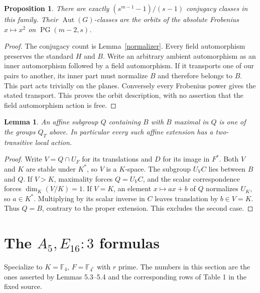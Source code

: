 \documentclass[11pt]{article}
\newtheorem{lemma}[theorem]{Lemma}
\newtheorem{proposition}[theorem]{Proposition}
\newcommand{\F}{\mathbb F}
\newcommand{\PG}{\operatorname{PG}}
\newcommand{\Aut}{\operatorname{Aut}}
\begin{document}
\begin{proposition}\label{general}
There are exactly $(s^{m-1}-1)/(s-1)$ conjugacy classes in this family.
Their $\Aut(G)$-classes are the orbits of the absolute Frobenius
$x\mapsto x^2$ on $\PG(m-2,s)$.
\end{proposition}
\begin{proof}
The conjugacy count is Lemma~\ref{normalizer}. Every field automorphism
preserves the standard $H$ and $B$. Write an arbitrary ambient
automorphism as an inner automorphism followed by a field automorphism.
If it transports one of our pairs to another, its inner part must
normalize $B$ and therefore belongs to $B$. This part acts trivially
on the planes. Conversely every Frobenius power gives the stated
transport. This proves the orbit description, with no assertion that
the field automorphism action is free.
\end{proof}

\begin{lemma}\label{affine}
An affine subgroup $Q$ containing $B$ with $B$ maximal in $Q$ is one of
the groups $Q_T$ above. In particular every such affine extension has
a two-transitive local action.
\end{lemma}
\begin{proof}
Write $V=Q\cap U_F$ for its translations and $D$ for its image in
$F^*$. Both $V$ and $K$ are stable under $K^*$, so $V$ is a
$K$-space. The subgroup $U_VC$ lies between $B$ and $Q$. If $V>K$,
maximality forces $Q=U_VC$, and the scalar correspondence forces
$\dim_K(V/K)=1$. If $V=K$, an element $x\mapsto ax+b$ of $Q$
normalizes $U_K$, so $a\in K^*$. Multiplying by its scalar inverse
in $C$ leaves translation by $b\in V=K$. Thus $Q=B$, contrary to
the proper extension. This excludes the second case.
\end{proof}

\section{The $A_5,E_{16}:3$ formulas}
Specialize to $K=\F_4$, $F=\F_{4^r}$ with $r$ prime. The numbers
in this section are the ones asserted by Lemmas 5.3--5.4 and the
corresponding rows of Table 1 in the fixed source.
\end{document}
